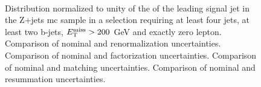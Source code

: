 \begin{figure}[h!]
\centering 
{}
\\
\caption{Distribution normalized to unity of the \pt of the leading signal jet in the Z+jets \gls{mc} sample in a selection requiring at least four jets, at least two b-jets, $E_{\rm T}^{\mathrm{miss}}>200$ GeV and exactly zero lepton. 
 Comparison of nominal and renormalization uncertainties.
 Comparison of nominal and factorization uncertainties.
 Comparison of nominal and matching uncertainties.
 Comparison of nominal and resummation uncertainties.
}\label{fig:Z_met_0L_syst}
\end{figure}

